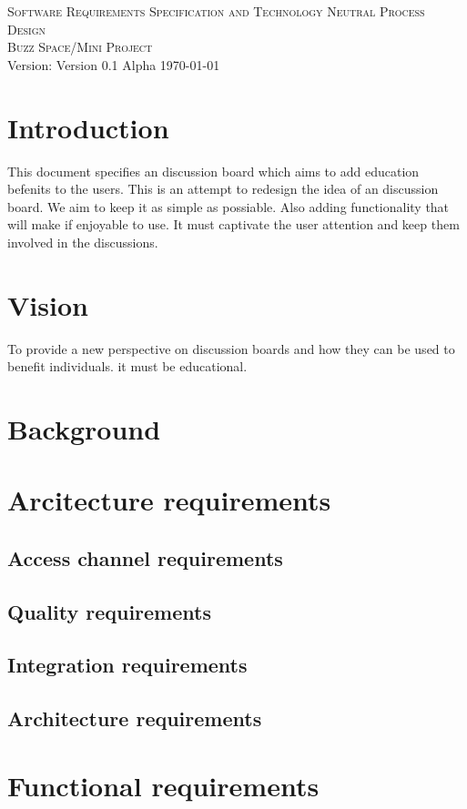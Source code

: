 \documentclass[a4paper,12pt]{report}
\begin{document}
\renewcommand{\thesection}{\arabic{section}}
\newpage
\begin{center}
\textsc{\LARGE Software Requirements Specification and Technology Neutral Process Design}\\[1.5cm]
\textsc{\Large Buzz Space/Mini Project}\\[0.5cm]
Version: Version 0.1 Alpha 
{\large \today}
\end{center}
\tableofcontents{}
\chapter{Introduction}
This document specifies an discussion board which aims to add education befenits to the users. This is an attempt to redesign the idea of an discussion board. We aim to keep it as simple as possiable. Also adding functionality that will make if enjoyable to use. It must captivate the user attention and keep them involved in the discussions. 
\chapter{Vision}
To provide a new perspective on discussion boards and how they can be used to benefit individuals. it must be educational. 
\chapter{Background}
\chapter{Arcitecture requirements}
\section{Access channel requirements}
\section{Quality requirements}
\section{Integration requirements}
\section{Architecture requirements}
\chapter{Functional requirements}
\end{document}
